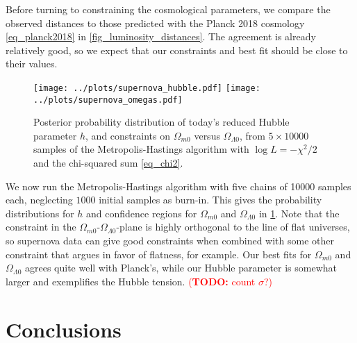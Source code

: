 \documentclass[10pt,a4paper]{article}
\newcommand\TODO[1]{\textcolor{red}{(\textbf{TODO:} #1)}}
\begin{document}
Before turning to constraining the cosmological parameters,
we compare the observed distances to those predicted with the Planck 2018 cosmology \eqref{eq_planck2018} in \cref{fig_luminosity_distances}.
The agreement is already relatively good, so we expect that our constraints and best fit should be close to their values.

\begin{figure}
	\centering
	\texttt{[image: ../plots/supernova\_hubble.pdf]}
	\texttt{[image: ../plots/supernova\_omegas.pdf]}
	\caption{%
		Posterior probability distribution of today's reduced Hubble parameter $h$,
		and constraints on $\Omega_{m0}$ versus $\Omega_{\Lambda0}$,
		from $5 \times 10000$ samples of the Metropolis-Hastings algorithm with $\log L = -\chi^2/2$ and the chi-squared sum \eqref{eq_chi2}.
	}
	\label{fig_supernova_mcmc}
\end{figure}

We now run the Metropolis-Hastings algorithm with five chains of 10000 samples each, neglecting $1000$ initial samples as burn-in.
This gives the probability distributions for $h$ and confidence regions for $\Omega_{m0}$ and $\Omega_{\Lambda0}$ in \cref{fig_supernova_mcmc}.
Note that the constraint in the $\Omega_{m0}$-$\Omega_{\Lambda0}$-plane is highly orthogonal to the line of flat universes,
so supernova data can give good constraints when combined with some other constraint that argues in favor of flatness, for example.
Our best fits for $\Omega_{m0}$ and $\Omega_{\Lambda0}$ agrees quite well with Planck's,
while our Hubble parameter is somewhat larger and exemplifies the Hubble tension.
\TODO{count $\sigma$?}

\section{Conclusions}

%
\printbibliography
\end{document}
